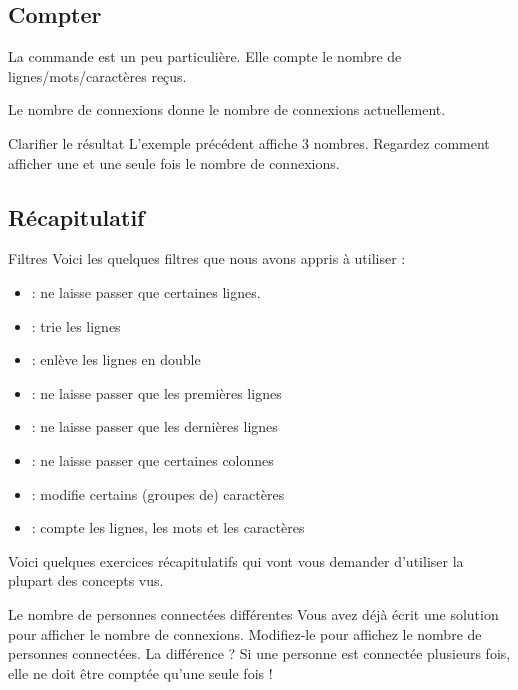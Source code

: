 \documentclass[a4paper,11pt]{style-esi/td}
\begin{document}
	\subsection{Compter}

		La commande  est un peu particulière.
		Elle compte le nombre de lignes/mots/caractères reçus.

		\begin{Exemple}{Le nombre de connexions}
			 donne le nombre de connexions actuellement.
		\end{Exemple}

		\begin{Exercice}{Clarifier le résultat}
			L'exemple précédent affiche 3 nombres.
			Regardez comment afficher une et une seule fois le nombre
			de connexions.
		\end{Exercice}

	\subsection{Récapitulatif}

		\begin{theorie}{Filtres}
			Voici les quelques filtres que nous avons appris à utiliser :
			\begin{itemize}
				\item {} : ne laisse passer que certaines lignes.
				\item {} : trie les lignes
				\item {} : enlève les lignes en double
				\item {} : ne laisse passer que les premières lignes
				\item {} : ne laisse passer que les dernières lignes
				\item {}  : ne laisse passer que certaines colonnes
				\item {} : modifie certains (groupes de) caractères
				\item {} : compte les lignes, les mots et les caractères
			\end{itemize}
		\end{theorie}
		
		Voici quelques exercices récapitulatifs qui vont vous demander 
		d'utiliser la plupart des concepts vus.

		\begin{Exemple}{Le nombre de personnes connectées différentes}
			Vous avez déjà écrit une solution pour afficher le nombre de connexions.
			Modifiez-le pour affichez le nombre de personnes connectées.
			La différence ? Si une personne est connectée plusieurs fois,
			elle ne doit être comptée qu'une seule fois !
		\end{Exemple}
	
\end{document}

